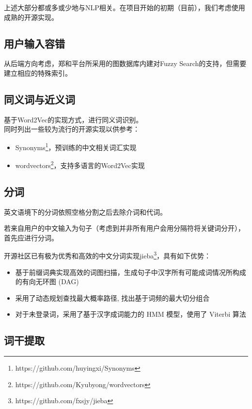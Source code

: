 \documentclass[UTF8]{ctexrep}
\begin{document}
上述大部分都或多或少地与NLP相关。在项目开始的初期（目前），我们考虑使用成熟的开源实现。

\subsection{用户输入容错}

从后端方向考虑，郑和平台所采用的图数据库内建对Fuzzy Search的支持，但需要建立相应的特殊索引。

\subsection{同义词与近义词}

基于Word2Vec的实现方式，进行同义词识别。\\

同时列出一些较为流行的开源实现以供参考：

\begin{itemize}
    \item Synonyms\footnote{https://github.com/huyingxi/Synonyms}，预训练的中文相关词汇实现
    \item wordvectors\footnote{https://github.com/Kyubyong/wordvectors}，支持多语言的Word2Vec实现
\end{itemize}

\subsection{分词}

英文语境下的分词依照空格分割之后去除介词和代词。

若来自用户的中文输入为句子（考虑到并非所有用户会用分隔符将关键词分开），首先应进行分词。

开源社区已有极为优秀和高效的中文分词实现jieba\footnote{https://github.com/fxsjy/jieba}，具有如下优势：

\begin{itemize}
    \item 基于前缀词典实现高效的词图扫描，生成句子中汉字所有可能成词情况所构成的有向无环图 (DAG)
    \item 采用了动态规划查找最大概率路径, 找出基于词频的最大切分组合
    \item 对于未登录词，采用了基于汉字成词能力的 HMM 模型，使用了 Viterbi 算法
\end{itemize}

\subsection{词干提取}
\end{document}
